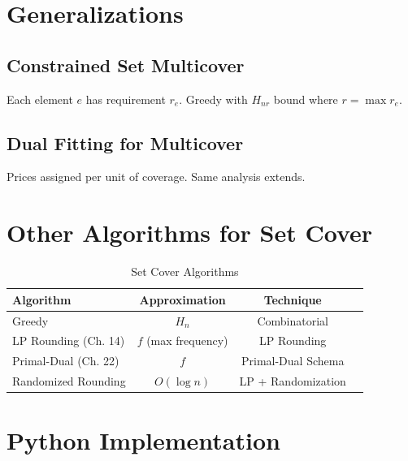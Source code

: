 \documentclass[11pt,oneside]{book}
\begin{document}
\section{Generalizations}

\subsection{Constrained Set Multicover}
Each element $e$ has requirement $r_e$. Greedy with $H_{nr}$ bound where $r = \max r_e$.

\subsection{Dual Fitting for Multicover}
Prices assigned per unit of coverage. Same analysis extends.

\section{Other Algorithms for Set Cover}

\begin{table}[H]
\centering
\caption{Set Cover Algorithms}
\begin{tabular}{lccc}
\toprule
Algorithm & Approximation & Technique \\
\midrule
Greedy & $H_n$ & Combinatorial \\
LP Rounding (Ch. 14) & $f$ (max frequency) & LP Rounding \\
Primal-Dual (Ch. 22) & $f$ & Primal-Dual Schema \\
Randomized Rounding & $O(\log n)$ & LP + Randomization \\
\bottomrule
\end{tabular}
\end{table}

\section{Python Implementation}
\end{document}
